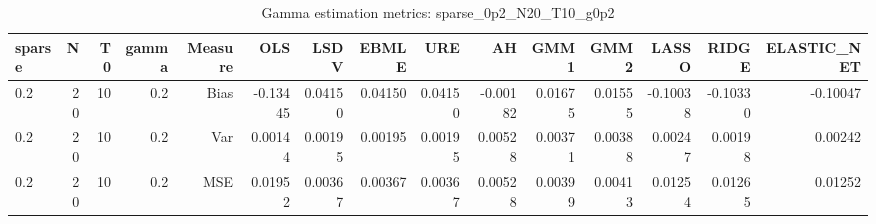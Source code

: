 \begin{table}[!htbp]\centering
\caption{Gamma estimation metrics: sparse_0p2_N20_T10_g0p2}
\label{tab:table1_sparse_0p2_N20_T10_g0p2}
\begin{tabular}{lrrrrrrrrrrrrrr}
\hline
sparse & N & T0 & gamma & Measure & OLS & LSDV & EBMLE & URE & AH & GMM1 & GMM2 & LASSO & RIDGE & ELASTIC_NET \\
\hline
0.2 & 20 & 10 & 0.2 & Bias & -0.13445 & 0.04150 & 0.04150 & 0.04150 & -0.00182 & 0.01675 & 0.01555 & -0.10038 & -0.10330 & -0.10047 \\
0.2 & 20 & 10 & 0.2 & Var & 0.00144 & 0.00195 & 0.00195 & 0.00195 & 0.00528 & 0.00371 & 0.00388 & 0.00247 & 0.00198 & 0.00242 \\
0.2 & 20 & 10 & 0.2 & MSE & 0.01952 & 0.00367 & 0.00367 & 0.00367 & 0.00528 & 0.00399 & 0.00413 & 0.01254 & 0.01265 & 0.01252 \\
\hline
\end{tabular}
\end{table}

